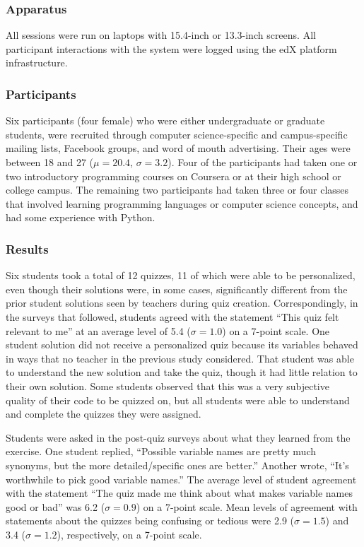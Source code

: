 \subsubsection{Apparatus}

All sessions were run on laptops with 15.4-inch or 13.3-inch screens. All participant interactions with the system were logged using the edX platform infrastructure.

\subsubsection{Participants}

Six participants (four female) who were either undergraduate or graduate students, were recruited through computer science-specific and campus-specific mailing lists, Facebook groups, and word of mouth advertising. Their ages were between 18 and 27 ($\mu=20.4$, $\sigma=3.2$). Four of the participants had taken one or two introductory programming courses on Coursera or at their high school or college campus. The remaining two participants had taken three or four classes that involved learning programming languages or computer science concepts, and had some experience with Python.

\subsubsection{Results}
Six students took a total of 12 quizzes, 11 of which were able to be personalized, even though their solutions were, in some cases, significantly different from the prior student solutions seen by teachers during quiz creation. Correspondingly, in the surveys that followed, students agreed with the statement ``This quiz felt relevant to me'' at an average level of 5.4 ($\sigma = 1.0$) on a 7-point scale. One student solution did not receive a personalized quiz because its variables behaved in ways that no teacher in the previous study considered. That student was able to understand the new solution and take the quiz, though it had little relation to their own solution. Some students observed that this was a very subjective quality of their code to be quizzed on, but all students were able to understand and complete the quizzes they were assigned.

Students were asked in the post-quiz surveys about what they learned from the exercise. One student replied, ``Possible variable names are pretty much synonyms, but the more detailed/specific ones are better.'' Another wrote, ``It's worthwhile to pick good variable names.'' The average level of student agreement with the statement ``The quiz made me think about what makes variable names good or bad'' was 6.2 ($\sigma = 0.9$) on a 7-point scale. Mean levels of agreement with statements about the quizzes being confusing or tedious were 2.9 ($\sigma = 1.5$) and 3.4 ($\sigma = 1.2$), respectively, on a 7-point scale.

